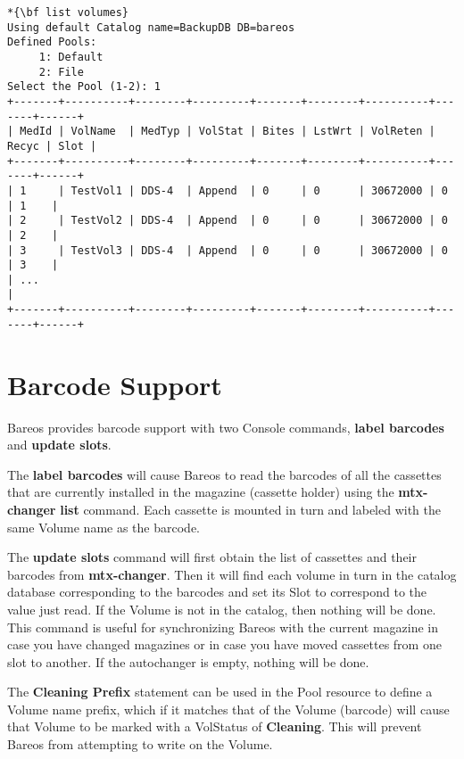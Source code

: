 \footnotesize
\begin{verbatim}
*{\bf list volumes}
Using default Catalog name=BackupDB DB=bareos
Defined Pools:
     1: Default
     2: File
Select the Pool (1-2): 1
+-------+----------+--------+---------+-------+--------+----------+-------+------+
| MedId | VolName  | MedTyp | VolStat | Bites | LstWrt | VolReten | Recyc | Slot |
+-------+----------+--------+---------+-------+--------+----------+-------+------+
| 1     | TestVol1 | DDS-4  | Append  | 0     | 0      | 30672000 | 0     | 1    |
| 2     | TestVol2 | DDS-4  | Append  | 0     | 0      | 30672000 | 0     | 2    |
| 3     | TestVol3 | DDS-4  | Append  | 0     | 0      | 30672000 | 0     | 3    |
| ...                                                                            |
+-------+----------+--------+---------+-------+--------+----------+-------+------+
\end{verbatim}
\normalsize



\section{Barcode Support}
\label{Barcodes}

Bareos provides barcode support with two Console commands, {\bf label
barcodes} and {\bf update slots}.

The {\bf label barcodes} will cause Bareos to read the barcodes of all the
cassettes that are currently installed in the magazine (cassette holder) using
the {\bf mtx-changer} {\bf list} command. Each cassette is mounted in turn and
labeled with the same Volume name as the barcode.

The {\bf update slots} command will first obtain the list of cassettes and
their barcodes from {\bf mtx-changer}. Then it will find each volume in turn
in the catalog database corresponding to the barcodes and set its Slot to
correspond to the value just read. If the Volume is not in the catalog, then
nothing will be done. This command is useful for synchronizing Bareos with the
current magazine in case you have changed magazines or in case you have moved
cassettes from one slot to another. If the autochanger is empty, nothing will
be done.

The {\bf Cleaning Prefix} statement can be used in the Pool resource to define
a Volume name prefix, which if it matches that of the Volume (barcode) will
cause that Volume to be marked with a VolStatus of {\bf Cleaning}. This will
prevent Bareos from attempting to write on the Volume.


